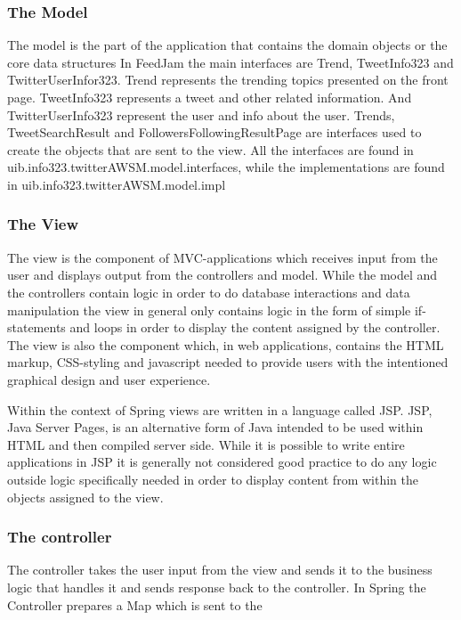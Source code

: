 \subsubsection{The Model} %
The model is the part of the application that contains the domain objects or the core data structures \citep{}%
In FeedJam the main interfaces are Trend, TweetInfo323 and TwitterUserInfor323. Trend represents the trending topics presented on the front page. TweetInfo323 represents a tweet and other related information. And TwitterUserInfo323 represent the user and info about the user. Trends, TweetSearchResult and FollowersFollowingResultPage are interfaces used to create the objects that are sent to the view. All the interfaces are found in uib.info323.twitterAWSM.model.interfaces, while the implementations are found in uib.info323.twitterAWSM.model.impl

\subsubsection{The View}
The view is the component of MVC-applications which receives input from the user and displays output from the controllers and model. While the model and the controllers contain logic in order to do database interactions and data manipulation the view in general only contains logic in the form of simple if-statements and loops in order to display the content assigned by the controller. The view is also the component which, in web applications, contains the HTML markup, CSS-styling and javascript needed to provide users with the intentioned graphical design and user experience.

Within the context of Spring views are written in a language called JSP. JSP, Java Server Pages, is an alternative form of Java intended to be used within HTML and then compiled server side. While it is possible to write entire applications in JSP it is generally not considered good practice to do any logic outside logic specifically needed in order to display content from within the objects assigned to the view.

\subsubsection{The controller}
The controller takes the user input from the view and sends it to the business logic that handles it and sends response back to the controller.
In Spring the Controller prepares a Map which is sent to the 

